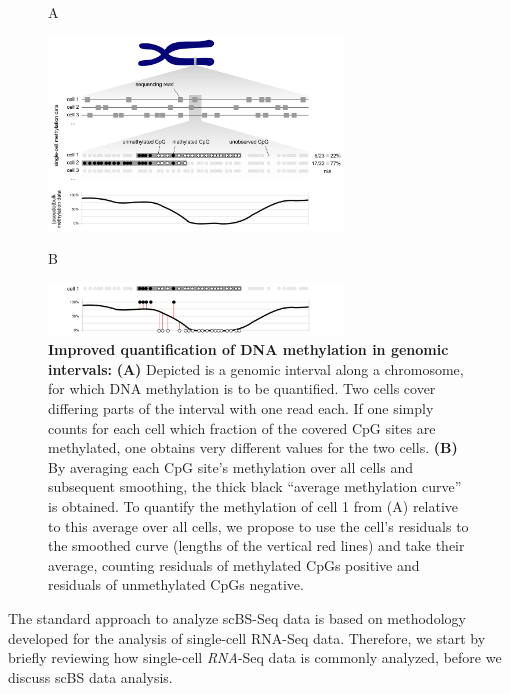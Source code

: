 \documentclass[twocolumn,10pt]{article}
\begin{document}
\begin{figure}[t]
    \hspace{2.5cm}A\\[-7ex]
    \begin{center}
        \includegraphics[width=0.7\textwidth]{figures/Fig_residuals_A.png}\\
    \end{center}
    \hspace{2.5cm}B\\[-3ex]
    \begin{center}
        \includegraphics[width=0.7\textwidth]{figures/Fig_residuals_B.png}
    \end{center}
    \caption{\small \textbf{Improved quantification of DNA methylation in genomic intervals:} \textbf{(A)} Depicted is a genomic interval along a chromosome, for which DNA methylation is to be quantified. Two cells cover differing parts of the interval with one read each. If one simply counts for each cell which fraction of the covered CpG sites are methylated, one obtains very different values for the two cells. \textbf{(B)} By averaging each CpG site's methylation over all cells and subsequent smoothing, the thick black ``average methylation curve'' is obtained. To quantify the methylation of cell 1 from (A) relative to this average over all cells, we propose to use the cell's residuals to the smoothed curve (lengths of the vertical red lines) and take their average, counting residuals of methylated CpGs positive and residuals of unmethylated CpGs negative.}
    \label{fig:smoothres}
\end{figure}


The standard approach to analyze scBS-Seq data is based on methodology developed for the analysis of single-cell RNA-Seq data. Therefore, we start by briefly reviewing how single-cell \emph{RNA}-Seq data is commonly analyzed, before we discuss scBS data analysis.
\end{document}
